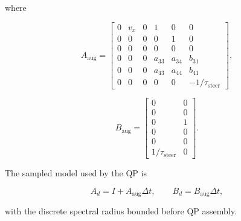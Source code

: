 \documentclass[9pt]{article}
\begin{document}
where

\begin{equation}
A_{\mathrm{aug}}=
\begin{bmatrix}
0 & v_x & 0 & 1 & 0 & 0\\
0 & 0 & 0 & 0 & 1 & 0\\
0 & 0 & 0 & 0 & 0 & 0\\
0 & 0 & 0 & a_{33} & a_{34} & b_{31}\\
0 & 0 & 0 & a_{43} & a_{44} & b_{41}\\
0 & 0 & 0 & 0 & 0 & -1/\tau_{\mathrm{steer}}
\end{bmatrix},
\end{equation}

\begin{equation}
B_{\mathrm{aug}}=
\begin{bmatrix}
0 & 0\\
0 & 0\\
0 & 1\\
0 & 0\\
0 & 0\\
1/\tau_{\mathrm{steer}} & 0
\end{bmatrix}.
\end{equation}

The sampled model used by the QP is

\begin{equation}
A_d=I+A_{\mathrm{aug}}\Delta t,
\qquad
B_d=B_{\mathrm{aug}}\Delta t,
\end{equation}

with the discrete spectral radius bounded before QP assembly.
\end{document}
